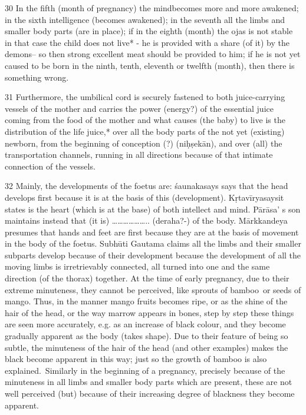 \begin{translation}
\begin{tt}
\item[30]In the fifth (month of pregnancy) the mindbecomes more and more 
awakened; in the sixth intelligence (becomes awakened); in the seventh all the 
limbs and smaller body parts (are in place); if in the eighth (month) the ojas is 
not stable in that case the child does not live* - he is provided with a share (of it) 
by the demons– so then strong excellent meat should be provided to him; if he is 
not yet caused to be born in the ninth, tenth, eleventh or twelfth  (month), then 
there is something wrong.

\item[31]Furthermore, the umbilical cord is securely fastened to both 
juice-carrying vessels of the mother and carries the power (energy?) of the 
essential juice coming from the food of the mother and what causes (the baby) to 
live is the distribution of the life juice,* over all the body parts of the not yet 
(existing) newborn, from the beginning of conception (?) (niḥṣekān), and over 
(all) the transportation channels, running in all directions because of that 
intimate connection of the vessels.

\item[32]Mainly, the developments of the foetus are: śaunakasays says that the 
head develops first because it is at the basis of this (development). 
Kṛtavīryasaysit states is the heart (which is at the base) of both intellect and 
mind. Pārāsa’ s son maintains instead that (it is) ……………….. (deraha?-) of the 
body. Mārkkandeya presumes that hands and feet are first because they are at 
the basis of movement in the body of the foetus. Subhūti Gautama claims all the 
limbs and their smaller subparts develop because of their development because 
the development of all the moving limbs is irretrievably connected, all turned 
into one and the same direction (of the thorax) together. At the time of early 
pregnancy, due to their extreme minuteness, they cannot be perceived, like 
sprouts of bamboo or seeds of mango. Thus, in the manner mango fruits 
becomes ripe, or as the shine of the hair of the head, or the way marrow appears 
in bones, step by step these things are seen more accurately, e.g. as an increase 
of black colour, and they become gradually apparent as the body (takes shape). 
Due to their feature of being so subtle, the minuteness of the hair of the head 
(and other examples) makes the black become apparent in this way; just so the 
growth of bamboo is also explained. Similarly in the beginning of a pregnancy, 
precisely  because of the minuteness in all limbs and smaller body parts which 
are present, these are not well perceived (but) because of their increasing 
degree of blackness they become apparent.


\end{tt}
\end{translation}
